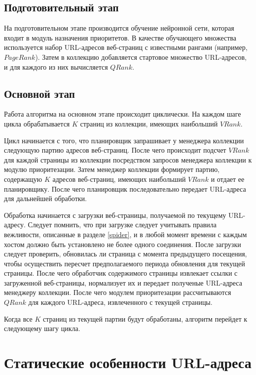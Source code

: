 \subsection*{Подготовительный этап}

На подготовительном этапе производится обучение нейронной сети, которая входит в модуль назначения приоритетов. В качестве обучающего множества используется набор URL-адресов веб-страниц с известными рангами (например, $PageRank$). Затем в коллекцию добавляется стартовое множество URL-адресов, и для каждого из них вычисляется $QRank$.

\subsection*{Основной этап}

Работа алгоритма на основном этапе происходит циклически. На каждом шаге цикла обрабатывается $K$ страниц из коллекции, имеющих наибольший $VRank$. 

Цикл начинается с того, что планировщик запрашивает у менеджера коллекции следующую партию адресов веб-страниц. После чего происходит подсчет $VRank$ для каждой страницы из коллекции посредством запросов менеджера коллекции к модулю приоритезации. Затем менеджер коллекции формирует партию, содержащую $K$ адресов веб-страниц, имеющих наибольший $VRank$ и отдает ее планировщику. После чего планировщик последовательно передает URL-адреса для дальнейшей обработки. 

Обработка начинается с загрузки веб-страницы, получаемой по текущему URL-адресу. Следует помнить, что при загрузке следует учитывать правила вежливости, описанные в разделе \ref{spider}, и в любой момент времени с каждым хостом должно быть установлено не более одного соединения. После загрузки следует проверить, обновилась ли страница с момента предыдущего посещения, чтобы осуществить пересчет предполагаемого периода обновления для текущей страницы. После чего обработчик содержимого страницы извлекает ссылки с загруженной веб-страницы, нормализует их и передает полученые URL-адреса менеджеру коллекции. После чего модулем приоритезации рассчитываются $QRank$ для каждого URL-адреса, извлеченного с текущей страницы.

Когда все $K$ страниц из текущей партии будут обработаны, алгоритм перейдет к следующему шагу цикла.

\section{Статические особенности URL-адреса}
\label{static_features}

